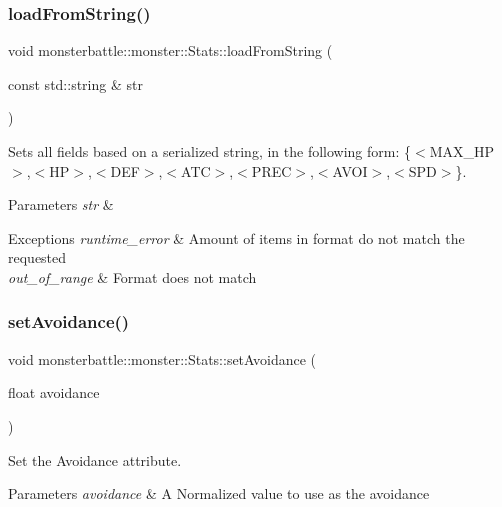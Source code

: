 \subsubsection{\texorpdfstring{load\+From\+String()}{loadFromString()}}
{\footnotesize\ttfamily void monsterbattle\+::monster\+::\+Stats\+::load\+From\+String (\begin{DoxyParamCaption}\item[{const std\+::string \&}]{str }\end{DoxyParamCaption})}



Sets all fields based on a serialized string, in the following form\+: \{$<$\+M\+A\+X\+\_\+\+H\+P$>$,$<$\+H\+P$>$,$<$\+D\+E\+F$>$,$<$\+A\+T\+C$>$,$<$\+P\+R\+E\+C$>$,$<$\+A\+V\+O\+I$>$,$<$\+S\+P\+D$>$\}. 


\begin{DoxyParams}{Parameters}
{\em str} & \\
\hline
\end{DoxyParams}

\begin{DoxyExceptions}{Exceptions}
{\em runtime\+\_\+error} & Amount of items in format do not match the requested \\
\hline
{\em out\+\_\+of\+\_\+range} & Format does not match \\
\hline
\end{DoxyExceptions}
\mbox{\label{structmonsterbattle_1_1monster_1_1Stats_a7e75ea5eca5546e4b50ffe3c7a93b104}} 
\subsubsection{\texorpdfstring{set\+Avoidance()}{setAvoidance()}}
{\footnotesize\ttfamily void monsterbattle\+::monster\+::\+Stats\+::set\+Avoidance (\begin{DoxyParamCaption}\item[{float}]{avoidance }\end{DoxyParamCaption})}



Set the Avoidance attribute. 


\begin{DoxyParams}{Parameters}
{\em avoidance} & A Normalized value to use as the avoidance\\
\hline
\end{DoxyParams}

